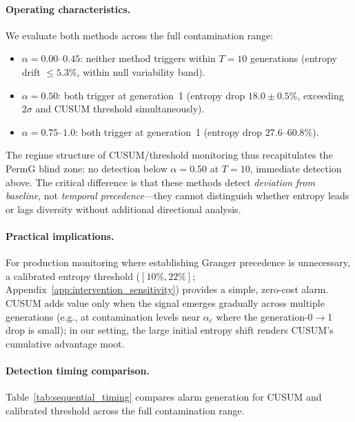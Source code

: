 \paragraph{Operating characteristics.}
We evaluate both methods across the full contamination range:
\begin{itemize}
\item $\alpha{=}0.00$--$0.45$: neither method triggers within $T{=}10$ generations (entropy drift ${\leq}5.3\%$, within null variability band).
\item $\alpha{=}0.50$: both trigger at generation~1 (entropy drop $18.0{\pm}0.5\%$, exceeding $2\sigma$ and CUSUM threshold simultaneously).
\item $\alpha{=}0.75$--$1.0$: both trigger at generation~1 (entropy drop $27.6$--$60.8\%$).
\end{itemize}
The regime structure of CUSUM/threshold monitoring thus recapitulates the PermG blind zone: no detection below $\alpha{=}0.50$ at $T{=}10$, immediate detection above.
The critical difference is that these methods detect \emph{deviation from baseline}, not \emph{temporal precedence}---they cannot distinguish whether entropy leads or lags diversity without additional directional analysis.

\paragraph{Practical implications.}
For production monitoring where establishing Granger precedence is unnecessary, a calibrated entropy threshold ($[10\%, 22\%]$; Appendix~\ref{app:intervention_sensitivity}) provides a simple, zero-cost alarm.
CUSUM adds value only when the signal emerges gradually across multiple generations (e.g., at contamination levels near $\alpha_c$ where the generation-0$\to$1 drop is small); in our setting, the large initial entropy shift renders CUSUM's cumulative advantage moot.

\paragraph{Detection timing comparison.}
Table~\ref{tab:sequential_timing} compares alarm generation for CUSUM and calibrated threshold across the full contamination range.

